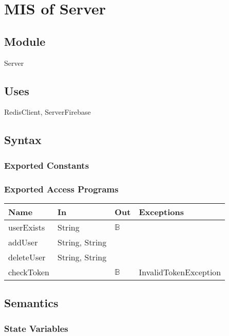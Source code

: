 \documentclass[12pt, titlepage]{article}
\begin{document}
\medskip
\newpage
\section{MIS of Server} \label{Server} 

\subsection{Module}

Server

\subsection{Uses}

RedisClient, ServerFirebase

\subsection{Syntax}

\subsubsection{Exported Constants}

\subsubsection{Exported Access Programs}

\begin{center}
\begin{tabular}{p{2cm} p{4cm} p{2cm} p{6cm}}
\hline
\textbf{Name} & \textbf{In} & \textbf{Out} & \textbf{Exceptions} \\
\hline
userExists & String & $\mathbb{B}$ & \\ \hline
addUser & String, String & & \\ \hline
deleteUser & String, String & & \\ \hline
checkToken & & $\mathbb{B}$ & InvalidTokenException \\
\hline
\end{tabular}
\end{center}

\subsection{Semantics}

\subsubsection{State Variables}
\end{document}
